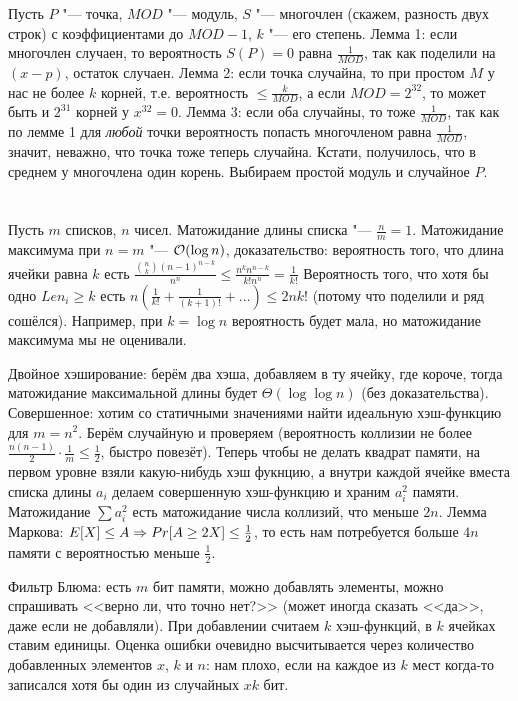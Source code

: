 Пусть $P$ "--- точка, $MOD$ "--- модуль, $S$ "--- многочлен (скажем, разность двух строк) с коэффициентами до $MOD-1$, $k$ "--- его степень.
Лемма 1: если многочлен случаен, то вероятность $S(P)=0$ равна $\frac{1}{MOD}$, так как поделили на $(x-p)$, остаток случаен.
Лемма 2: если точка случайна, то при простом $M$ у нас не более $k$ корней, т.е. вероятность $\le \frac{k}{MOD}$, а если $MOD=2^{32}$, то может быть и $2^{31}$ корней у $x^{32}=0$.
Лемма 3: если оба случайны, то тоже $\frac{1}{MOD}$, так как по лемме 1 для \textit{любой} точки вероятность попасть многочленом равна $\frac{1}{MOD}$, значит, неважно, что точка тоже теперь случайна.
Кстати, получилось, что в среднем у многочлена один корень.
Выбираем простой модуль и случайное $P$.

\section{} %
Пусть $m$ списков, $n$ чисел.
Матожидание длины списка "--- $\frac{n}{m} = 1$.
Матожидание максимума при $n=m$ "--- $\mathcal{O}(\log n)$, доказательство: вероятность того, что длина ячейки равна $k$ есть
$\frac{\binom{n}{k}(n-1)^{n-k}}{n^n} \le \frac{n^kn^{n-k}}{k!n^n} = \frac{1}{k!}$
Вероятность того, что хотя бы одно $Len_i \ge k$ есть $n(\frac{1}{k!}+\frac{1}{(k+1)!}+\dots) \le {2n}{k!}$ (потому что поделили и ряд сошёлся).
Например, при $k = \log n$ вероятность будет мала, но матожидание максимума мы не оценивали.

Двойное хэширование: берём два хэша, добавляем в ту ячейку, где короче, тогда матожидание максимальной длины будет $\Theta (\log \log n)$ (без доказательства).
Совершенное: хотим со статичными значениями найти идеальную хэш-функцию для $m=n^2$.
Берём случайную и проверяем (вероятность коллизии не более $\frac{n(n-1)}{2} \cdot \frac{1}{m} \le \frac 12$, быстро повезёт).
Теперь чтобы не делать квадрат памяти, на первом уровне взяли какую-нибудь хэш фукнцию, а внутри каждой ячейке вместа списка длины $a_i$ делаем совершенную хэш-функцию и храним $a_i^2$ памяти.
Матожидание $\sum a_i^2$ есть матожидание числа коллизий, что меньше $2n$.
Лемма Маркова: $E[X] \le A \Rightarrow Pr[A \ge 2X] \le \frac 12$, то есть нам потребуется больше $4n$ памяти с вероятностью меньше $\frac 12$.

Фильтр Блюма: есть $m$ бит памяти, можно добавлять элементы, можно спрашивать <<верно ли, что точно нет?>> (может иногда сказать <<да>>, даже если не добавляли).
При добавлении считаем $k$ хэш-функций, в $k$ ячейках ставим единицы.
Оценка ошибки очевидно высчитывается через количество добавленных элементов $x$, $k$ и $n$: нам плохо, если на каждое из $k$ мест когда-то записался хотя бы один из случайных $xk$ бит.
